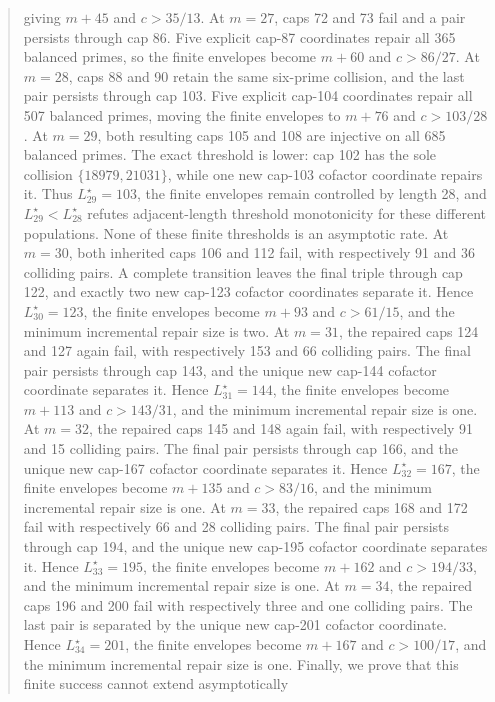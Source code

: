 \documentclass[11pt]{article}
\begin{document}
\begin{abstract}
giving \(m+45\) and \(c>35/13\). At \(m=27\), caps 72 and 73 fail and a
pair persists through cap 86. Five explicit cap-87 coordinates repair all
365 balanced primes, so the finite envelopes become \(m+60\) and
\(c>86/27\). At \(m=28\), caps 88 and 90 retain the same six-prime
collision, and the last pair persists through cap 103. Five explicit
cap-104 coordinates repair all 507 balanced primes, moving the finite
envelopes to \(m+76\) and \(c>103/28\). At \(m=29\), both resulting caps
105 and 108 are injective on all 685 balanced primes. The exact threshold is
lower: cap 102 has the sole collision \(\{18979,21031\}\), while one new
cap-103 cofactor coordinate repairs it. Thus \(L_{29}^{\star}=103\), the
finite envelopes remain controlled by length 28, and
\(L_{29}^{\star}<L_{28}^{\star}\) refutes adjacent-length threshold
monotonicity for these different populations. None of these finite
thresholds is an asymptotic rate. At \(m=30\), both inherited caps 106 and
112 fail, with respectively 91 and 36 colliding pairs. A complete transition
leaves the final triple through cap 122, and exactly two new cap-123 cofactor
coordinates separate it. Hence \(L_{30}^{\star}=123\), the finite envelopes
become \(m+93\) and \(c>61/15\), and the minimum incremental repair size is
two. At \(m=31\), the repaired caps 124 and 127 again fail, with respectively
153 and 66 colliding pairs. The final pair persists through cap 143, and the
unique new cap-144 cofactor coordinate separates it. Hence
\(L_{31}^{\star}=144\), the finite envelopes become \(m+113\) and
\(c>143/31\), and the minimum incremental repair size is one. At \(m=32\),
the repaired caps 145 and 148 again fail, with respectively 91 and 15
colliding pairs. The final pair persists through cap 166, and the unique new
cap-167 cofactor coordinate separates it. Hence \(L_{32}^{\star}=167\), the
finite envelopes become \(m+135\) and \(c>83/16\), and the minimum
incremental repair size is one. At \(m=33\), the repaired caps 168 and 172
fail with respectively 66 and 28 colliding pairs. The final pair persists
through cap 194, and the unique new cap-195 cofactor coordinate separates
it. Hence \(L_{33}^{\star}=195\), the finite envelopes become \(m+162\)
and \(c>194/33\), and the minimum incremental repair size is one.
At \(m=34\), the repaired caps 196 and 200 fail with respectively three and
one colliding pairs. The last pair is separated by the unique new cap-201
cofactor coordinate. Hence \(L_{34}^{\star}=201\), the finite envelopes
become \(m+167\) and \(c>100/17\), and the minimum incremental repair size
is one.
Finally, we prove that this finite success cannot extend asymptotically

\end{abstract}
\end{document}
